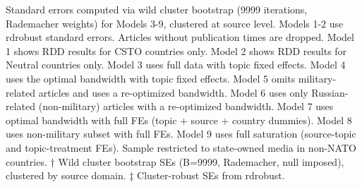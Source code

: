\begin{table}[!t]
\begin{minipage}{\linewidth}
Standard errors computed via wild cluster bootstrap (9999 iterations, Rademacher
weights) for Models 3-9, clustered at source level. Models 1-2 use rdrobust
standard errors. Articles without publication times are dropped. Model 1 shows
RDD results for CSTO countries only. Model 2 shows RDD results for Neutral
countries only. Model 3 uses full data with topic fixed effects. Model 4 uses
the optimal bandwidth with topic fixed effects. Model 5 omits military-related
articles and uses a re-optimized bandwidth. Model 6 uses only Russian-related
(non-military) articles with a re-optimized bandwidth. Model 7 uses optimal
bandwidth with full FEs (topic + source + country dummies). Model 8 uses
non-military subset with full FEs. Model 9 uses full saturation (source-topic
and topic-treatment FEs). Sample restricted to state-owned media in non-NATO
countries. † Wild cluster bootstrap SEs (B=9999, Rademacher, null imposed),
clustered by source domain. ‡ Cluster-robust SEs from rdrobust.\\
\end{minipage}
\end{table}

